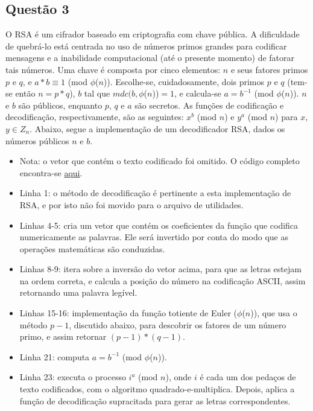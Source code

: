 \documentclass{article}
\begin{document}
\subsection*{Questão 3}

O RSA é um cifrador baseado em criptografia com chave pública. A dificuldade
de quebrá-lo está centrada no uso de números primos grandes para codificar
mensagens e a inabilidade computacional (até o presente momento) de fatorar
tais números. Uma chave é composta por cinco elementos: $n$ e seus fatores
primos $p$ e $q$, e $a*b \equiv 1$ (mod $\phi$($n$)). Escolhe-se,
cuidadosamente, dois primos $p$ e $q$ (tem-se então $n = p*q$), $b$ tal que
$mdc(b, \phi$($n$))$ = 1$, e calcula-se $a = b^{-1}$ (mod $\phi$($n$)).
$n$ e $b$ são públicos, enquanto $p$, $q$ e $a$ são secretos. As funções de
codificação e decodificação, respectivamente, são as seguintes:
$x^{b}$ (mod $n$) e $y^{a}$ (mod $n$) para $x$, $y \in Z_{n}$. Abaixo, segue a
implementação de um decodificador RSA, dados os números públicos $n$ e $b$.

\begin{itemize}

    

    \item Nota: o vetor que contém o texto codificado foi omitido. O código
        completo encontra-se
        \href{https://raw.githubusercontent.com/zambonin/UFSC-INE5451/master/modern/rsa.py}{aqui}.

    \item Linha 1: o método de decodificação é pertinente a esta implementação
        de RSA, e por isto não foi movido para o arquivo de utilidades.

    \item Linhas 4-5: cria um vetor que contém os coeficientes da função que
        codifica numericamente as palavras. Ele será invertido por conta do
        modo que as operações matemáticas são conduzidas.

    \item Linhas 8-9: itera sobre a inversão do vetor acima, para que as
        letras estejam na ordem correta, e calcula a posição do número na
        codificação ASCII, assim retornando uma palavra legível.

    \item Linhas 15-16: implementação da função totiente de Euler
        ($\phi$($n$)), que usa o método $p - 1$, discutido abaixo, para
        descobrir os fatores de um número primo, e assim retornar
        $(p-1)*(q-1)$.

    \item Linha 21: computa $a = b^{-1}$ (mod $\phi$($n$)).

    \item Linha 23: executa o processo $i^{a}$ (mod $n$), onde $i$ é cada um
        dos pedaços de texto codificados, com o algoritmo
        quadrado-e-multiplica. Depois, aplica a função de decodificação
        supracitada para gerar as letras correspondentes.

\end{itemize}
\end{document}
